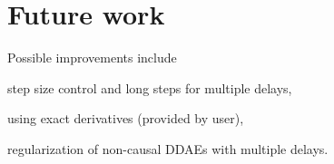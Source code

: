 \documentclass[final,reqno]{siamltex}
\renewenvironment{enumerate}[1]{\begin{compactenum}#1}{\end{compactenum}}
\begin{document}
\section{Future work}
Possible improvements include
\begin{enumerate}
\item step size control and long steps for multiple delays,
\item using exact derivatives (provided by user),
\item regularization of non-causal DDAEs with multiple delays.
\end{enumerate}




%
\end{document}
